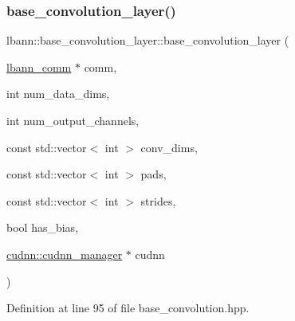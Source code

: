 \subsubsection{\texorpdfstring{base\+\_\+convolution\+\_\+layer()}{base\_convolution\_layer()}\hspace{0.1cm}{\footnotesize\ttfamily [1/2]}}
{\footnotesize\ttfamily lbann\+::base\+\_\+convolution\+\_\+layer\+::base\+\_\+convolution\+\_\+layer (\begin{DoxyParamCaption}\item[{\hyperlink{classlbann_1_1lbann__comm}{lbann\+\_\+comm} $\ast$}]{comm,  }\item[{int}]{num\+\_\+data\+\_\+dims,  }\item[{int}]{num\+\_\+output\+\_\+channels,  }\item[{const std\+::vector$<$ int $>$}]{conv\+\_\+dims,  }\item[{const std\+::vector$<$ int $>$}]{pads,  }\item[{const std\+::vector$<$ int $>$}]{strides,  }\item[{bool}]{has\+\_\+bias,  }\item[{\hyperlink{classlbann_1_1cudnn_1_1cudnn__manager}{cudnn\+::cudnn\+\_\+manager} $\ast$}]{cudnn }\end{DoxyParamCaption})\hspace{0.3cm}{\ttfamily [inline]}}



Definition at line 95 of file base\+\_\+convolution.\+hpp.


